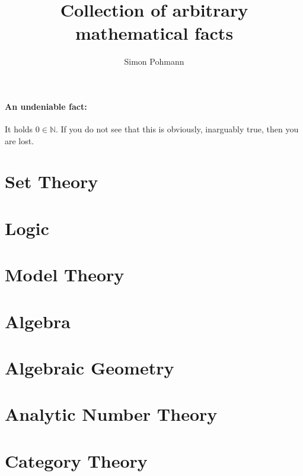\documentclass{scrartcl}
\title{Collection of arbitrary mathematical facts}
\author{Simon Pohmann}
\date{}
\newcommand{\N}{\mathbb{N}}
\begin{document}
\maketitle

\tableofcontents

\paragraph{An undeniable fact:} It holds $0 \in \N$. If you do not see that this is obviously, inarguably true, then you are lost.

\section{Set Theory}



\section{Logic}



\section{Model Theory}



\section{Algebra}



\section{Algebraic Geometry}



\section{Analytic Number Theory}



\section{Category Theory}


\end{document}
